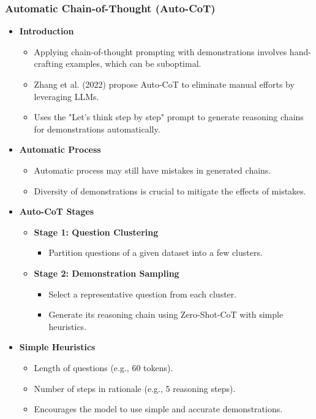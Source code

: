 \begin{frame}[fragile]\frametitle{Automatic Chain-of-Thought (Auto-CoT)}

\begin{itemize}
  \item \textbf{Introduction}
    \begin{itemize}
      \item Applying chain-of-thought prompting with demonstrations involves hand-crafting examples, which can be suboptimal.
      \item Zhang et al. (2022) propose Auto-CoT to eliminate manual efforts by leveraging LLMs.
      \item Uses the "Let’s think step by step" prompt to generate reasoning chains for demonstrations automatically.
    \end{itemize}

  \item \textbf{Automatic Process}
    \begin{itemize}
      \item Automatic process may still have mistakes in generated chains.
      \item Diversity of demonstrations is crucial to mitigate the effects of mistakes.
    \end{itemize}

  \item \textbf{Auto-CoT Stages}
    \begin{itemize}
      \item \textbf{Stage 1: Question Clustering}
        \begin{itemize}
          \item Partition questions of a given dataset into a few clusters.
        \end{itemize}

      \item \textbf{Stage 2: Demonstration Sampling}
        \begin{itemize}
          \item Select a representative question from each cluster.
          \item Generate its reasoning chain using Zero-Shot-CoT with simple heuristics.
        \end{itemize}
    \end{itemize}

  \item \textbf{Simple Heuristics}
    \begin{itemize}
      \item Length of questions (e.g., 60 tokens).
      \item Number of steps in rationale (e.g., 5 reasoning steps).
      \item Encourages the model to use simple and accurate demonstrations.
    \end{itemize}
\end{itemize}

\end{frame}

